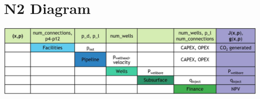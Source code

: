 \documentclass[balance,upint,subscriptcorrection,varvw,mathalfa=cal=boondoxo,spanish,french,vietnamese,russian,greek,pdf-a,colorlinks]{asmeconf}
\begin{document}
\section[Appendix B]{N2 Diagram}\label{appendix:a}
\begin{center}
    \includegraphics[width=2\linewidth]{images/n2_diagram.jpg}
\end{center}




\end{document}
